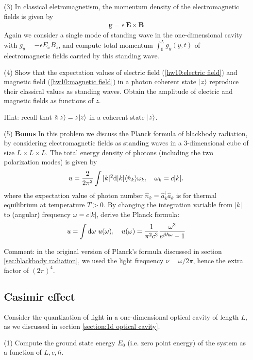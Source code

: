 (3) In classical eletromagnetism, the momentum density of the electromagnetic fields is given by 
\begin{align}
    \textbf{g}=\epsilon~\textbf{E}\times\textbf{B}
\end{align}
Again we consider a single mode of standing wave in the one-dimensional cavity with $g_y=-\epsilon E_xB_z$, and compute total momentum $\int_0^L g_y(y,t)$ of electromagnetic fields carried by this standing wave. 

(4) Show that the expectation values of electric field (\ref{hw10:electric field}) and magnetic field (\ref{hw10:magnetic field}) in a photon coherent state $|{z}\rangle$ reproduce their classical values as standing waves. Obtain the amplitude of electric and magnetic fields as functions of $z$. 

Hint: recall that $\hat a|{z}\rangle=z|{z}\rangle$ in a coherent state $|{z}\rangle$. 


(5) \textbf{Bonus} In this problem we discuss the Planck formula of blackbody radiation, by considering electromagnetic fields as standing waves in a 3-dimensional cube of size $L\times L\times L$. The total energy density of photons (including the two polarization modes) is given by
\begin{align}
    u=\frac2{2\pi^2}\int|k|^2\mathrm{d}|k|\langle{\hat n_k}\rangle\omega_k,~~~\omega_k=c|k|.
\end{align}
where the expectation value of photon number $\hat n_k=\hat a_k^\dagger\hat a_k$ is for thermal equilibrium at temperature $T>0$. By changing the integration variable from $|k|$ to (angular) frequency $\omega=c|k|$, derive the Planck formula:
\begin{align}
    u=\int\mathrm{d}\omega~u(\omega),~~~u(\omega)=\frac1{\pi^2c^3}\frac{\omega^3}{e^{\beta\hbar\omega}-1}
\end{align}

Comment: in the original version of Planck's formula discussed in section \ref{sec:blackbody radiation}, we used the light frequency $\nu=\omega/2\pi$, hence the extra factor of $(2\pi)^4$. 


\subsection{Casimir effect}

Consider the quantization of light in a one-dimensional optical cavity of length $L$, as we discussed in section \ref{section:1d optical cavity}. 

(1) Compute the ground state energy $E_0$ (i.e. zero point energy) of the system as a function of $L,c,\hbar$. 

